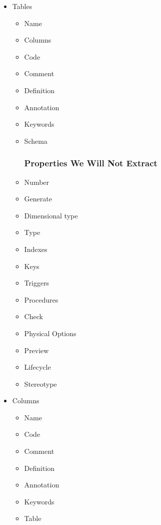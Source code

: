 \documentclass[12pt,a4paper]{report}
\begin{document}
\begin{itemize}
	\item Tables
	\begin{itemize}
		\item Name 
		\item Columns
		\item Code 
		\item Comment
		\item Definition
		\item Annotation
		\item Keywords
		\item Schema
		\subsubsection{Properties We Will Not Extract}
		\item Number
		\item Generate
		\item Dimensional type
		\item Type
		\item Indexes
		\item Keys 
		\item Triggers
		\item Procedures
		\item Check 
		\item Physical Options
		\item Preview
		\item Lifecycle 
		\item Stereotype
	\end{itemize}
	\item Columns
	\begin{itemize}
		\item Name 
		\item Code 
		\item Comment
		\item Definition
		\item Annotation
		\item Keywords
		\item Table

\end{itemize}
\end{itemize}
\end{document}
